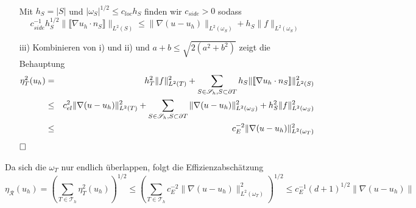 \begin{itemize}
\begin{eqnarray*}
	\end{eqnarray*}
	Mit $h_S =|S|$ und $|\omega_S|^{1/2} \leq c_{loc}h_S$ finden wir $c_{side}>0$ sodass	
	\[
	c_{side}^{-1}h_S^{1/2} \|\llbracket \nabla u_h \cdot n_S\rrbracket\|_{L^2(S)} \leq \|\nabla (u-u_h)\|_{L^2(\omega_S)} +h_S\|f\|_{L^2(\omega_S)}
	\]
	\item[iii)]
	Kombinieren von i) und ii) und $a+b\leq \sqrt{2(a^2+b^2)}$ zeigt die Behauptung
	\begin{eqnarray*}
		\eta^2_T(u_h) &=& h^2_T\|f\|^2_{L^2(T)} + \sum_{S\in\mathscr{S}_h,S\subset\partial T} h_S\|\llbracket \nabla u_h \cdot n_S\rrbracket\|^2_{L^2(S)} \\
		&\leq& c_{el}^2 \|\nabla (u-u_h)\|_{L^2(T)}^2 + \sum_{S\in\mathscr{S}_h,S\subset\partial T}\|\nabla (u-u_h)\|_{L^2(\omega_S)}^2 +h_S^2\|f\|_{L^2(\omega_S)}^2\\
		&\leq&  c_E^{-2}\|\nabla (u-u_h)\|_{L^2(\omega_T)}^2
	\end{eqnarray*}
$\hfill \Box$
\end{itemize}
Da sich die $\omega_T$ nur endlich überlappen, folgt die Effizienzabschätzung
\[
\eta_\mathscr{R}(u_h) = \left( \sum_{T\in\mathscr{T}_h} \eta^2_T(u_h)\right)^{1/2} \leq \left( \sum_{T\in\mathscr{T}_h} c_E^{-2}\|\nabla (u-u_h)\|_{L^2(\omega_T)}^2\right)^{1/2} \leq c_E^{-1}(d+1)^{1/2} \|\nabla(u-u_h)\|
\]